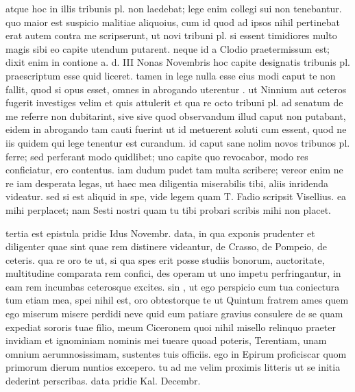  atque hoc in illis tribunis pl. non laedebat; lege enim collegi sui non tenebantur. quo maior est suspicio malitiae aliquoius, cum id quod ad ipsos nihil pertinebat erat autem contra me scripserunt, ut novi tribuni pl. si essent timidiores multo magis sibi eo capite utendum putarent. neque id a Clodio praetermissum est; dixit enim in contione a. d. III Nonas Novembris hoc capite designatis tribunis pl. praescriptum esse quid liceret. tamen in lege nulla esse eius modi caput te non fallit, quod si opus esset, omnes in abrogando uterentur . ut Ninnium aut ceteros fugerit investiges velim et quis attulerit et qua re octo tribuni pl. ad senatum de me referre non dubitarint, sive sive quod observandum illud caput non putabant, eidem in abrogando tam cauti fuerint ut id metuerent soluti cum essent, quod ne iis quidem qui lege tenentur est curandum. id caput sane nolim novos tribunos pl. ferre; sed perferant modo quidlibet; uno capite quo revocabor, modo res conficiatur, ero contentus. iam dudum pudet tam multa scribere; vereor enim ne re iam desperata legas, ut haec mea diligentia miserabilis tibi, aliis inridenda videatur. sed si est aliquid in spe, vide legem quam T. Fadio scripsit Visellius. ea mihi perplacet; nam Sesti nostri quam tu tibi probari scribis mihi non placet.

 tertia est epistula pridie Idus Novembr. data, in qua exponis prudenter et diligenter quae sint quae rem distinere videantur, de Crasso, de Pompeio, de ceteris. qua re oro te ut, si qua spes erit posse studiis bonorum, auctoritate, multitudine comparata rem confici, des operam ut uno impetu perfringantur, in eam rem incumbas ceterosque excites. sin , ut ego perspicio cum tua coniectura tum etiam mea, spei nihil est, oro obtestorque te ut Quintum fratrem ames quem ego miserum misere perdidi neve quid eum patiare gravius consulere de se quam expediat sororis tuae filio, meum Ciceronem quoi nihil misello relinquo praeter invidiam et ignominiam nominis mei tueare quoad poteris, Terentiam, unam omnium aerumnosissimam, sustentes tuis officiis. ego in Epirum proficiscar quom primorum dierum nuntios excepero. tu ad me velim proximis litteris ut se initia dederint perscribas. data pridie Kal. Decembr.
